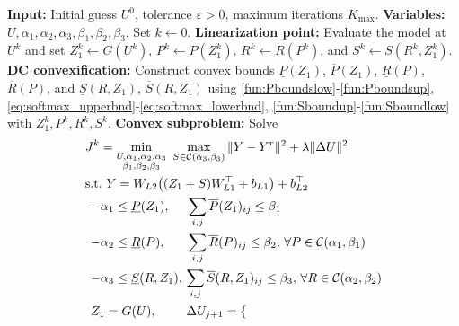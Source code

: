 \documentclass{ifacconf}
\begin{document}
\begin{algorithm}[t]
\caption{CCP Algorithm TFE-based MPC}\label{alg:MCCPA}
\begin{algorithmic}[1]
\State \textbf{Input:} Initial guess $U^{0}$, tolerance $\varepsilon > 0$, maximum iterations $K_{\max}$.
\State \textbf{Variables:} 
$U,\alpha_1,\alpha_2,\alpha_3,\beta_1,\beta_2,\beta_3$.
\State Set $k \gets 0$.
\Repeat
    \State \textbf{Linearization point:} Evaluate the model at $U^k$ and set $Z_1^{k}\gets G(U^k)$, 
           $P^k\gets P(Z_1^{k})$, $R^{k} \gets R(P^{k})$, and $S^k\gets S(R^{k}, Z_1^{k})$.
    \State \textbf{DC convexification:} 
           Construct convex bounds
           $\underline{P}(Z_1)$, $\overline{P}(Z_1)$, 
           $\underline{R}(P)$, $\overline{R}(P)$, and
           $\underline{S}(R,Z_1)$, $\overline{S}(R,Z_1)$
           using
           \eqref{fun:Pboundslow}-\eqref{fun:Pboundsup}, \eqref{eq:softmax_upperbnd}-\eqref{eq:softmax_lowerbnd}, \eqref{fun:Sboundup}-\eqref{fun:Sboundlow}
           with $Z_1^{k},P^{k}, R^{k}, S^k$.
    \State \textbf{Convex subproblem:}
           Solve
    \begin{align*}
      & J^{k} = \min_{\substack{U,\alpha_1,\alpha_2,\alpha_3\\\beta_1,\beta_2,\beta_3}} \  \max_{S\in \mathcal{C}(\alpha_3, \beta_3)}
      \|Y - Y^r\|^2 + \lambda \|\Delta U\|^2
      \\
      & \text{s.t.} \ 
      Y = W_{L2}\bigl((Z_1 + S)W_{L1}^\top + b_{L1}\bigr) + b_{L2}^\top
      \\
      &\hspace{1ex}
      \begin{alignedat}{2}
      &{-\alpha_1} \leq \underline{P}(Z_1), &
      & \sum_{i,j} \overline{P}(Z_1)_{ij} \le \beta_1
      \\
      &{-\alpha_2} \le \underline{R}(P), &
      &\sum_{i,j} \overline{R}(P)_{ij} \le \beta_2, 
      \,\forall P \in \mathcal{C}(\alpha_1, \beta_1)
      \\
      &{-\alpha_3} \le \underline{S}(R,Z_1), \ & 
      &\smash[l]{\sum_{i,j} \overline{S}(R,Z_1)_{ij} \le \beta_3},
      \,\forall R \in \mathcal{C}(\alpha_2, \beta_2)
      \\
      &Z_1 = G(U), &
      &\Delta U_{j+1} = \begin{cases} 

\end{cases}
\end{alignedat}
\end{align*}
\end{algorithmic}
\end{algorithm}
\end{document}
